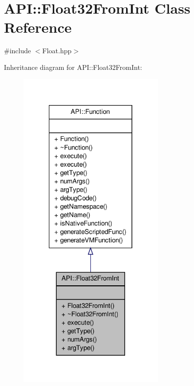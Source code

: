 \hypertarget{class_a_p_i_1_1_float32_from_int}{\section{A\-P\-I\-:\-:Float32\-From\-Int Class Reference}
\label{class_a_p_i_1_1_float32_from_int}
}


{\ttfamily \#include $<$Float.\-hpp$>$}



Inheritance diagram for A\-P\-I\-:\-:Float32\-From\-Int\-:
\nopagebreak
\begin{figure}[H]
\begin{center}
\leavevmode
\includegraphics[width=206pt]{class_a_p_i_1_1_float32_from_int__inherit__graph}
\end{center}
\end{figure}


